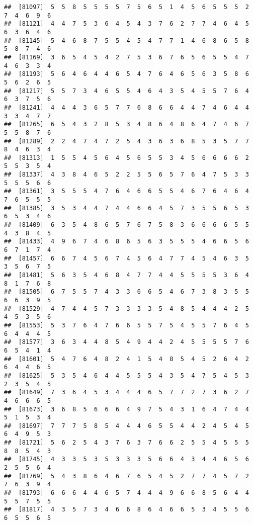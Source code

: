 \documentclass[
]{book}
\begin{document}
\begin{verbatim}
##  [81097]  5  5  8  5  5  5  5  7  5  6  5  1  4  5  6  5  5  5  2  7  4  6  9  6
##  [81121]  4  4  7  5  3  6  4  5  4  3  7  6  2  7  7  4  6  4  5  6  3  6  4  6
##  [81145]  5  4  6  8  7  5  5  4  5  4  7  7  1  4  6  8  6  5  8  5  8  7  4  6
##  [81169]  3  6  5  4  5  4  2  7  5  3  6  7  6  5  6  5  5  4  7  4  6  3  3  4
##  [81193]  5  6  4  6  4  4  6  5  4  7  6  4  6  5  6  3  5  8  6  5  6  2  6  5
##  [81217]  5  5  7  3  4  6  5  5  4  6  4  3  5  4  5  5  7  6  4  6  3  7  5  6
##  [81241]  4  4  4  3  6  5  7  7  6  8  6  6  4  4  7  4  6  4  4  3  3  4  7  7
##  [81265]  6  5  4  3  2  8  5  3  4  8  6  4  8  6  4  7  4  6  7  5  5  8  7  6
##  [81289]  2  2  4  7  4  7  2  5  4  3  6  3  6  8  5  3  5  7  7  8  4  6  3  4
##  [81313]  1  5  5  4  5  6  4  5  6  5  5  3  4  5  6  6  6  6  2  5  5  3  5  4
##  [81337]  4  3  8  4  6  5  2  2  5  5  6  5  7  6  4  7  5  3  3  5  5  5  6  6
##  [81361]  3  5  5  5  4  7  6  4  6  6  5  5  4  6  7  6  4  6  4  7  6  5  5  5
##  [81385]  3  5  3  4  4  7  4  4  6  6  4  5  7  3  5  5  6  5  3  6  5  3  4  6
##  [81409]  6  3  5  4  8  6  5  7  6  7  5  8  3  6  6  6  6  5  5  4  3  8  4  5
##  [81433]  4  9  6  7  4  6  8  6  5  6  3  5  5  5  4  6  6  5  6  6  7  1  7  4
##  [81457]  6  6  7  4  5  6  7  4  5  6  4  7  7  4  5  4  6  3  5  3  5  6  7  5
##  [81481]  5  6  3  5  4  6  8  4  7  7  4  4  5  5  5  5  3  6  4  8  1  7  6  8
##  [81505]  6  7  5  5  7  4  3  3  6  6  5  4  6  7  3  8  3  5  5  6  6  3  9  5
##  [81529]  4  7  4  4  5  7  3  3  3  3  5  4  8  5  4  4  4  2  5  4  5  3  5  6
##  [81553]  5  3  7  6  4  7  6  6  5  5  7  5  4  5  5  7  6  4  5  6  4  4  4  5
##  [81577]  3  6  3  4  4  8  5  4  9  4  4  2  4  5  5  5  5  7  6  6  5  4  1  4
##  [81601]  5  4  7  6  4  8  2  4  1  5  4  8  5  4  5  2  6  4  2  6  4  4  6  5
##  [81625]  5  3  5  4  6  4  4  5  5  5  4  3  5  4  7  5  4  5  3  2  3  5  4  5
##  [81649]  7  3  6  4  5  3  4  4  4  6  5  7  7  2  7  3  6  2  7  4  6  6  6  5
##  [81673]  3  6  8  5  6  6  6  4  9  7  5  4  3  1  6  4  7  4  4  5  1  5  3  4
##  [81697]  7  7  7  5  8  5  4  4  4  6  5  5  4  4  2  4  5  4  5  6  4  9  5  3
##  [81721]  5  6  2  5  4  3  7  6  3  7  6  6  2  5  5  4  5  5  5  8  8  5  4  3
##  [81745]  4  3  3  5  3  5  3  3  3  5  6  6  4  3  4  4  6  5  6  2  5  5  6  4
##  [81769]  5  4  3  8  6  4  6  7  6  5  4  5  2  7  7  4  5  7  2  7  6  3  9  4
##  [81793]  6  6  6  4  4  6  5  7  4  4  4  9  6  6  8  5  6  4  4  5  5  7  5  5
##  [81817]  4  3  5  7  3  4  6  6  8  6  4  6  6  5  3  4  5  5  6  6  5  5  6  5

\end{verbatim}
\end{document}
